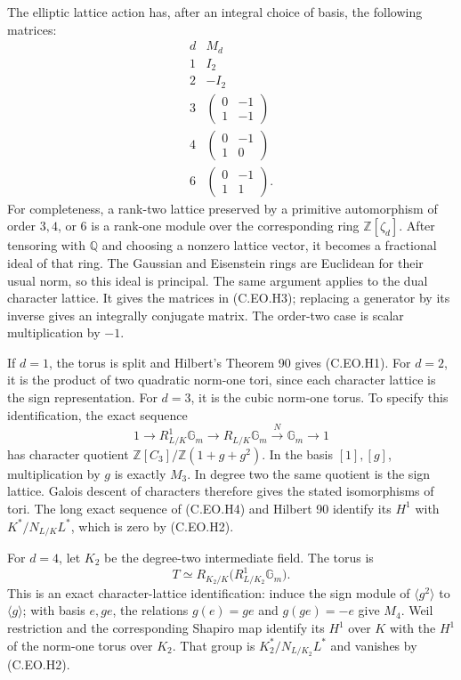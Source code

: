 The elliptic lattice action has, after an integral
choice of basis, the following matrices:
\[
\begin{array}{c|c}
d&M_d\\ \hline
1&I_2\\
2&-I_2\\
3&\begin{pmatrix}0&-1\\1&-1\end{pmatrix}\\
4&\begin{pmatrix}0&-1\\1&0\end{pmatrix}\\
6&\begin{pmatrix}0&-1\\1&1\end{pmatrix}.
\end{array}                                                   \tag{C.EO.H3}
\]
For completeness, a rank-two lattice preserved by a
primitive automorphism of order $3,4$, or $6$ is a
rank-one module over the corresponding ring
$\mathbb Z[\zeta_d]$. After tensoring with $\mathbb Q$
and choosing a nonzero lattice vector, it becomes
a fractional ideal of that ring. The Gaussian and
Eisenstein rings are Euclidean for their usual norm,
so this ideal is principal. The same argument applies
to the dual character lattice. It gives the matrices
in (C.EO.H3); replacing a generator by its inverse
gives an integrally conjugate matrix. The order-two
case is scalar multiplication by $-1$.

If $d=1$, the torus is split and Hilbert's Theorem 90
gives (C.EO.H1). For $d=2$, it is the product of two
quadratic norm-one tori, since each character lattice
is the sign representation. For $d=3$, it is the
cubic norm-one torus. To specify this identification,
the exact sequence
\[
 1\longrightarrow R^1_{L/K}\mathbb G_m
 \longrightarrow R_{L/K}\mathbb G_m
 \xrightarrow{\ N\ }\mathbb G_m\longrightarrow1
                                                               \tag{C.EO.H4}
\]
has character quotient
$\mathbb Z[C_3]/\mathbb Z(1+g+g^2)$.
In the basis $[1],[g]$, multiplication by $g$ is
exactly $M_3$. In degree two the same quotient is
the sign lattice. Galois descent of characters
therefore gives the stated isomorphisms of tori.
The long exact sequence of (C.EO.H4) and Hilbert 90
identify its $H^1$ with $K^*/N_{L/K}L^*$, which is
zero by (C.EO.H2).

For $d=4$, let $K_2$ be the degree-two intermediate
field. The torus is
\[
        T\simeq R_{K_2/K}
                  \bigl(R^1_{L/K_2}\mathbb G_m\bigr).
                                                               \tag{C.EO.H5}
\]
This is an exact character-lattice identification:
induce the sign module of $\langle g^2\rangle$
to $\langle g\rangle$; with basis $e,ge$, the
relations $g(e)=ge$ and $g(ge)=-e$ give $M_4$.
Weil restriction and the corresponding Shapiro
map identify its $H^1$ over $K$ with the $H^1$
of the norm-one torus over $K_2$. That group is
$K_2^*/N_{L/K_2}L^*$ and vanishes by (C.EO.H2).

